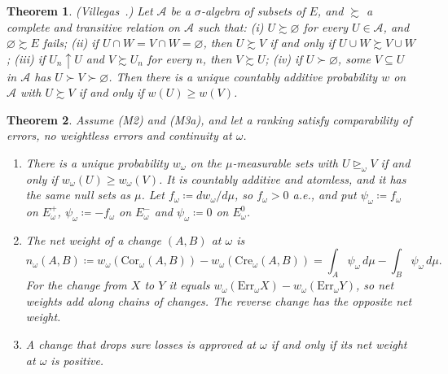 \documentclass[11pt]{article}
\newtheorem{theorem}{Theorem}[section]
\theoremstyle{definition}
\newcommand{\Err}{\mathrm{Err}}
\newcommand{\Cor}{\mathrm{Cor}}
\newcommand{\Cre}{\mathrm{Cre}}
\newcommand{\Ep}{E^{+}}
\newcommand{\Em}{E^{-}}
\newcommand{\Ez}{E^{0}}
\newcommand{\sge}{\trianglerighteq}
\begin{document}
\begin{theorem}\label{thm:villegas}
\emph{(Villegas~\cite{Villegas}.)} Let $\mathcal A$ be a $\sigma$-algebra of subsets of $E$, and $\succsim$ a complete and transitive relation on $\mathcal A$ such that: (i) $U\succsim\varnothing$ for every $U\in\mathcal A$, and $\varnothing\succsim E$ fails; (ii) if $U\cap W=V\cap W=\varnothing$, then $U\succsim V$ if and only if $U\cup W\succsim V\cup W$; (iii) if $U_n\uparrow U$ and $V\succsim U_n$ for every $n$, then $V\succsim U$; (iv) if $U\succ\varnothing$, some $V\subseteq U$ in $\mathcal A$ has $U\succ V\succ\varnothing$. Then there is a unique countably additive probability $w$ on $\mathcal A$ with $U\succsim V$ if and only if $w(U)\ge w(V)$.
\end{theorem}

\begin{theorem}\label{thm:repr}
Assume (M2) and (M3a), and let a ranking satisfy comparability of errors, no weightless errors and continuity at $\omega$.
\begin{enumerate}[label=(\alph*)]
\item There is a unique probability $w_\omega$ on the $\mu$-measurable sets with $U\sge_\omega V$ if and only if $w_\omega(U)\ge w_\omega(V)$. It is countably additive and atomless, and it has the same null sets as $\mu$. Let $f_\omega\coloneqq dw_\omega/d\mu$, so $f_\omega>0$ a.e., and put $\psi_\omega\coloneqq f_\omega$ on $\Ep_\omega$, $\psi_\omega\coloneqq-f_\omega$ on $\Em_\omega$ and $\psi_\omega\coloneqq0$ on $\Ez_\omega$.
\item The \emph{net weight} of a change $(A,B)$ at $\omega$ is
\[
n_\omega(A,B)\coloneqq w_\omega(\Cor_\omega(A,B))-w_\omega(\Cre_\omega(A,B))=\int_A\psi_\omega\,d\mu-\int_B\psi_\omega\,d\mu .
\]
For the change from $X$ to $Y$ it equals $w_\omega(\Err_\omega X)-w_\omega(\Err_\omega Y)$, so net weights add along chains of changes. The reverse change has the opposite net weight.
\item A change that drops sure losses is approved at $\omega$ if and only if its net weight at $\omega$ is positive.
\end{enumerate}
\end{theorem}
\end{document}
